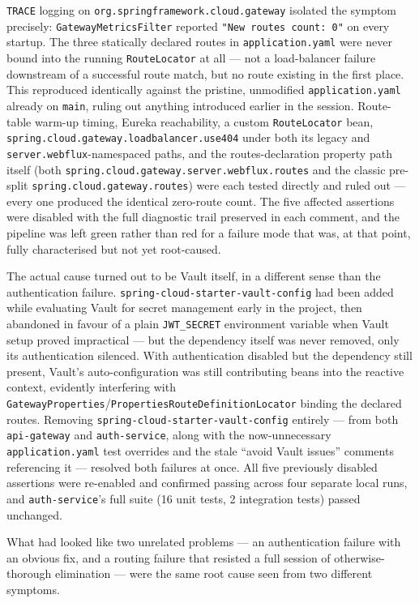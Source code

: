 \texttt{TRACE} logging on \texttt{org.springframework.cloud.gateway} isolated the symptom precisely: \texttt{GatewayMetricsFilter} reported \texttt{"New routes count: 0"} on every startup. The three statically declared routes in \texttt{application.yaml} were never bound into the running \texttt{RouteLocator} at all --- not a load-balancer failure downstream of a successful route match, but no route existing in the first place. This reproduced identically against the pristine, unmodified \texttt{application.yaml} already on \texttt{main}, ruling out anything introduced earlier in the session. Route-table warm-up timing, Eureka reachability, a custom \texttt{RouteLocator} bean, \texttt{spring.cloud.gateway.loadbalancer.use404} under both its legacy and \texttt{server.webflux}-namespaced paths, and the routes-declaration property path itself (both \texttt{spring.cloud.gateway.server.webflux.routes} and the classic pre-split \texttt{spring.cloud.gateway.routes}) were each tested directly and ruled out --- every one produced the identical zero-route count. The five affected assertions were disabled with the full diagnostic trail preserved in each comment, and the pipeline was left green rather than red for a failure mode that was, at that point, fully characterised but not yet root-caused.

The actual cause turned out to be Vault itself, in a different sense than the authentication failure. \texttt{spring-cloud-starter-vault-config} had been added while evaluating Vault for secret management early in the project, then abandoned in favour of a plain \texttt{JWT\_SECRET} environment variable when Vault setup proved impractical --- but the dependency itself was never removed, only its authentication silenced. With authentication disabled but the dependency still present, Vault's auto-configuration was still contributing beans into the reactive context, evidently interfering with \texttt{GatewayProperties}/\texttt{PropertiesRouteDefinitionLocator} binding the declared routes. Removing \texttt{spring-cloud-starter-vault-config} entirely --- from both \texttt{api-gateway} and \texttt{auth-service}, along with the now-unnecessary \texttt{application.yaml} test overrides and the stale ``avoid Vault issues'' comments referencing it --- resolved both failures at once. All five previously disabled assertions were re-enabled and confirmed passing across four separate local runs, and \texttt{auth-service}'s full suite (16 unit tests, 2 integration tests) passed unchanged.

What had looked like two unrelated problems --- an authentication failure with an obvious fix, and a routing failure that resisted a full session of otherwise-thorough elimination --- were the same root cause seen from two different symptoms.


